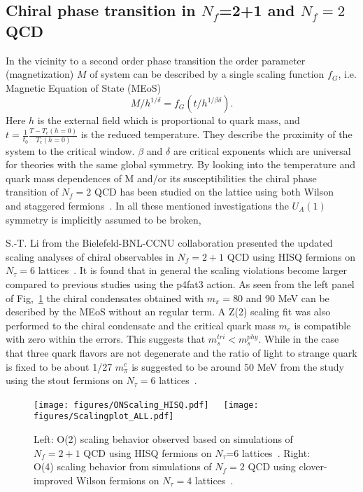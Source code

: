\documentclass{PoS}
\newcommand{\be}{\begin{equation}}
\newcommand{\ee}{\end{equation}}
\begin{document}
\subsection{Chiral phase transition in $N_f$=2+1 and $N_f=2$ QCD}
\label{sec:chiral}
In the vicinity to a second order phase transition the order parameter (magnetization) $M$ of system can be described by a single scaling function $f_G$, i.e. Magnetic Equation of State (MEoS)
\be
M/h^{1/\delta}=f_{G}(t/h^{1/\beta\delta}).
\ee
Here $h$ is the external field which is proportional to quark mass, and 
$t=\frac{1}{t_0}\frac{T-T_c(h=0)}{T_c(h=0)}$
is the reduced temperature. They describe the proximity of the system to the critical window. $\beta$ and $\delta$ are critical exponents which are universal for theories with the same global symmetry.
By looking into the temperature and quark mass dependences of M and/or its susceptibilities the chiral phase transition of $N_f=2$ QCD has been studied on the lattice using both Wilson ~\cite{Iwasaki:1996ya,Aoki:1998wg,PhysRevD.63.034502,Burger:2011zc,Bornyakov:2011yb} and staggered fermions~\cite{Karsch:1993tv,Karsch:1994hm,
Laermann:1998gf,Bernard:1996zw,Bernard:1999fv,DElia:2005bv,Mendes:2007ve}. In all these mentioned investigations 
the $U_A(1)$ symmetry is implicitly assumed to be broken,


S.-T. Li from the Bielefeld-BNL-CCNU collaboration presented the updated scaling analyses of chiral observables in $N_f=2+1$ QCD using HISQ fermions on $N_\tau=$6 lattices~\cite{LiLattice2016}.
It is found that in general the scaling violations become larger compared to previous studies using the p4fat3 action. As seen from the left panel of Fig,~\ref{fig:O4} the chiral condensates obtained with $m_\pi=80$ and 90 MeV can be described by the MEoS without an regular term. A Z(2) scaling fit was also performed to the chiral condensate and the critical quark mass $m_c$ is compatible with zero within the errors.
This suggests that $m_s^{tri}<m_s^{phy}$. While in the case that three quark flavors are not degenerate and the ratio of light to strange quark is 
 fixed to be about 1/27 $m_\pi^c$ is suggested to be around $50 $ MeV from the study using the stout fermions on $N_\tau=6$ lattices~\cite{Endrodi:2007gc}.
\begin{figure}[htp]
\begin{center}
\texttt{[image: figures/ONScaling\_HISQ.pdf]}~~~\texttt{[image: figures/Scalingplot\_ALL.pdf]}
\end{center}
\caption{Left: O(2) scaling behavior observed based on simulations of $N_f=2+1$ QCD using HISQ fermions on $N_\tau$=6 lattices~\cite{LiLattice2016}. Right: O(4) scaling behavior from simulations of $N_f=2$ QCD using clover-improved Wilson fermions on $N_\tau=4$ lattices~\cite{Umeda:2016qdo}. }
\label{fig:O4}
\end{figure}
\end{document}
